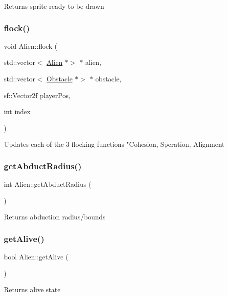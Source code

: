 Returns sprite ready to be drawn \mbox{\label{class_alien_a051e049fc66e47ff7ddf7bd2338b92a5}} 
\subsubsection{\texorpdfstring{flock()}{flock()}}
{\footnotesize\ttfamily void Alien\+::flock (\begin{DoxyParamCaption}\item[{std\+::vector$<$ \hyperlink{class_alien}{Alien} $\ast$$>$ $\ast$}]{alien,  }\item[{std\+::vector$<$ \hyperlink{class_obstacle}{Obstacle} $\ast$$>$ $\ast$}]{obstacle,  }\item[{sf\+::\+Vector2f}]{player\+Pos,  }\item[{int}]{index }\end{DoxyParamCaption})}

Updates each of the 3 flocking functions "Cohesion, Speration, Alignment \mbox{\label{class_alien_a9dbe59b6c7ec7ad946e113f0f05f7427}} 
\subsubsection{\texorpdfstring{get\+Abduct\+Radius()}{getAbductRadius()}}
{\footnotesize\ttfamily int Alien\+::get\+Abduct\+Radius (\begin{DoxyParamCaption}{ }\end{DoxyParamCaption})}

Returns abduction radius/bounds \mbox{\label{class_alien_a6da0e947ec0c70d429e54511d67ad608}} 
\subsubsection{\texorpdfstring{get\+Alive()}{getAlive()}}
{\footnotesize\ttfamily bool Alien\+::get\+Alive (\begin{DoxyParamCaption}{ }\end{DoxyParamCaption})}

Returns alive state \mbox{\label{class_alien_a3165f3c2c824c3784dd0054d48fd5c5a}} 
